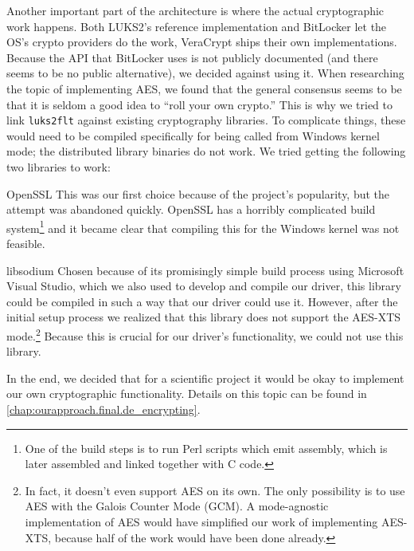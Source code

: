 Another important part of the architecture is where the actual cryptographic work happens. Both LUKS2's reference implementation and BitLocker let the OS's crypto providers do the work, VeraCrypt ships their own implementations. Because the API that BitLocker uses is not publicly documented (and there seems to be no public alternative), we decided against using it. When researching the topic of implementing AES, we found that the general consensus seems to be that it is seldom a good idea to ``roll your own crypto.'' This is why we tried to link \texttt{luks2flt} against existing cryptography libraries. To complicate things, these would need to be compiled specifically for being called from Windows kernel mode; the distributed library binaries do not work. We tried getting the following two libraries to work:
\begin{descitemize}
	\item[OpenSSL] This was our first choice because of the project's popularity, but the attempt was abandoned quickly. OpenSSL has a horribly complicated build system\footnote{\label{fn:ourapproach.final.opensslbuild} One of the build steps is to run Perl scripts which emit assembly, which is later assembled and linked together with C code.} and it became clear that compiling this for the Windows kernel was not feasible.
	\item[libsodium] Chosen because of its promisingly simple build process using Microsoft Visual Studio, which we also used to develop and compile our driver, this library could be compiled in such a way that our driver could use it. However, after the initial setup process we realized that this library does not support the AES-XTS mode.\footnote{\label{fn:ourapproach.final.libsodium} In fact, it doesn't even support AES on its own. The only possibility is to use AES with the Galois Counter Mode (GCM). A mode-agnostic implementation of AES would have simplified our work of implementing AES-XTS, because half of the work would have been done already.} Because this is crucial for our driver's functionality, we could not use this library.
\end{descitemize}

In the end, we decided that for a scientific project it would be okay to implement our own cryptographic functionality. Details on this topic can be found in \autoref{chap:ourapproach.final.de_encrypting}.

